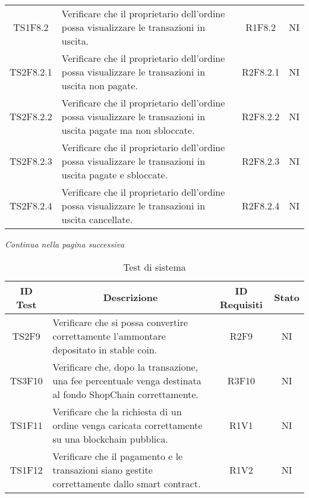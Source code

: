 \begin{table}[H]
\begin{tabular}{c|p{8cm}|c|c}
    TS1F8.2   & Verificare che il proprietario dell'ordine possa visualizzare le transazioni in uscita.                            & R1F8.2   & NI \\
    TS2F8.2.1 & Verificare che il proprietario dell'ordine possa visualizzare le transazioni in uscita non pagate.                 & R2F8.2.1 & NI \\
    TS2F8.2.2 & Verificare che il proprietario dell'ordine possa visualizzare le transazioni in uscita pagate ma non sbloccate.    & R2F8.2.2 & NI \\
    TS2F8.2.3 & Verificare che il proprietario dell'ordine possa visualizzare le transazioni in uscita pagate e sbloccate.         & R2F8.2.3 & NI \\
    TS2F8.2.4 & Verificare che il proprietario dell'ordine possa visualizzare le transazioni in uscita cancellate.                 & R2F8.2.4 & NI \\
  \end{tabular}
\end{table}
\begin{center}
  \textit{\small Continua nella pagina successiva}
\end{center}
\begin{table}[H]
  \centering
  \renewcommand{\arraystretch}{1.8}
  \begin{tabular}{c|p{8cm}|c|c}
    \rowcolor[HTML]{125E28}
    \color[HTML]{FFFFFF}\textbf{ID Test}
           & \multicolumn{1}{c}{\color[HTML]{FFFFFF}\textbf{Descrizione}}
           & \color[HTML]{FFFFFF}\textbf{ID Requisiti}
           & \color[HTML]{FFFFFF}\textbf{Stato}                                                                                      \\
    \hline
    TS2F9  & Verificare che si possa convertire correttamente l'ammontare depositato in stable coin.                    & R2F9  & NI \\
    TS3F10 & Verificare che, dopo la transazione, una fee percentuale venga destinata al fondo ShopChain correttamente. & R3F10 & NI \\
    TS1F11 & Verificare che la richiesta di un ordine venga caricata correttamente su una blockchain pubblica.          & R1V1  & NI \\
    TS1F12 & Verificare che il pagamento e le transazioni siano gestite correttamente dallo smart contract.             & R1V2  & NI \\
  \end{tabular}
  \caption{Test di sistema}
\end{table}

